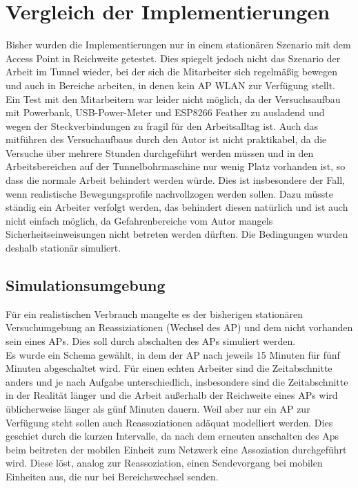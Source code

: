 \chapter{Vergleich der Implementierungen}
\label{ch:vergleich}
Bisher wurden die Implementierungen nur in einem stationären Szenario mit dem Access Point in Reichweite getestet. 
Dies spiegelt jedoch nicht das Szenario der Arbeit im Tunnel wieder, bei der sich die Mitarbeiter sich regelmäßig bewegen und auch in Bereiche arbeiten, in denen kein AP WLAN zur Verfügung stellt. \\
Ein Test mit den Mitarbeitern war leider nicht möglich, da der Versuchsaufbau mit Powerbank, USB-Power-Meter und ESP8266 Feather zu ausladend und wegen der Steckverbindungen zu fragil für den Arbeitsalltag ist.
Auch das mitführen des Versuchaufbaus durch den Autor ist nicht praktikabel, da die Versuche über mehrere Stunden durchgeführt werden müssen und in den Arbeitsbereichen auf der Tunnelbohrmaschine nur wenig Platz vorhanden ist, so dass die normale Arbeit behindert werden würde.
Dies ist insbesondere der Fall, wenn realistische Bewegungsprofile nachvollzogen werden sollen. 
Dazu müsste ständig ein Arbeiter verfolgt werden, das behindert diesen natürlich und ist auch nicht einfach möglich, da Gefahrenbereiche vom Autor mangels Sicherheitseinweisungen nicht betreten werden dürften.
Die Bedingungen wurden deshalb stationär simuliert.

\section{Simulationsumgebung}
Für ein realistischen Verbrauch mangelte es der bisherigen stationären Versuchumgebung an Reassiziationen (Wechsel des AP) und dem nicht vorhanden sein eines APs.
Dies soll durch abschalten des APs simuliert werden. \\
Es wurde ein Schema gewählt, in dem der AP nach jeweils 15 Minuten für fünf Minuten abgeschaltet wird. 
Für einen echten Arbeiter sind die Zeitabschnitte anders und je nach Aufgabe unterschiedlich, insbesondere sind die Zeitabschnitte in der Realität länger und die Arbeit außerhalb der Reichweite eines APs wird üblicherweise länger als günf Minuten dauern.
Weil aber nur ein AP zur Verfügung steht sollen auch Reassoziationen adäquat modelliert werden.
Dies geschiet durch die kurzen Intervalle, da nach dem erneuten anschalten des Aps beim beitreten der mobilen Einheit zum Netzwerk eine Assoziation durchgeführt wird. 
Diese löst, analog zur Reassoziation, einen Sendevorgang bei mobilen Einheiten aus, die nur bei Bereichswechsel senden.

